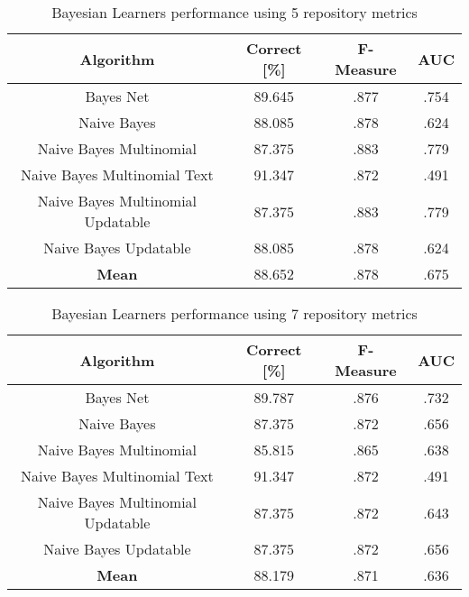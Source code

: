 \begin{table}[h!]		
\centering		
\begin{tabular}{ |c|c|c|c| } 		
 \hline		
 \textbf{Algorithm} & \textbf{Correct [\%]} & \textbf{F-Measure} & \textbf{AUC}  \\ 		
 \hline		
 Bayes Net & 89.645 & .877 & .754    \\ 		
 \hline		
 Naive Bayes &  88.085 & .878 & .624   \\ 		
 \hline		
  Naive Bayes Multinomial & 87.375 & .883 & .779\\ 		
 \hline		
  Naive Bayes Multinomial Text & 91.347 & .872 & .491  \\ 		
 \hline		
  Naive Bayes Multinomial Updatable & 87.375 & .883 & .779 \\ 		
 \hline		
  Naive Bayes Updatable & 88.085 & .878 & .624 \\ 		
 \hline	
 \textbf{Mean}  & 88.652 & .878 & .675 \\ 		
 \hline
		
\end{tabular}		
\caption{Bayesian Learners performance using 5 repository metrics}		
\label{table:BL_5}		
\end{table}

\begin{table}[h!]		
\centering		
\begin{tabular}{ |c|c|c|c| } 		
 \hline		
 \textbf{Algorithm} & \textbf{Correct [\%]} & \textbf{F-Measure} & \textbf{AUC}  \\ 		
 \hline		
 Bayes Net & 89.787 & .876 & .732    \\ 		
 \hline		
 Naive Bayes &  87.375 & .872 & .656   \\ 		
 \hline		
  Naive Bayes Multinomial & 85.815 & .865 & .638\\ 		
 \hline		
  Naive Bayes Multinomial Text & 91.347 & .872 & .491  \\ 		
 \hline		
  Naive Bayes Multinomial Updatable & 87.375 & .872 & .643 \\ 		
 \hline		
  Naive Bayes Updatable & 87.375 & .872 & .656 \\ 		
 \hline	
 \textbf{Mean}  & 88.179 & .871 & .636 \\ 		
 \hline
		
\end{tabular}		
\caption{Bayesian Learners performance using 7 repository metrics}		
\label{table:BL_7}		
\end{table}